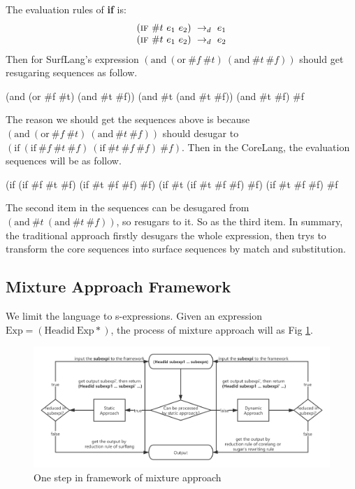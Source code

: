 The evaluation rules of {\bfseries if} is:
\[
\begin{array}{l}
(\mbox{\sc if}~\#t~e_1~e_2) ~\rightarrow_d~ e_1\\
(\mbox{\sc if}~\#t~e_1~e_2) ~\rightarrow_d~ e_2
\end{array}
\]
Then for SurfLang's expression $(\mbox{and}~(\mbox{or}~\#f~\#t)~(\mbox{and}~\#t~\#f))$ should get resugaring sequences as follow.

\begin{Codes}
    (and (or \#f \#t) (and \#t \#f))
\CoreStep (and \#t (and \#t \#f))
\CoreStep (and \#t \#f)
\CoreStep \#f
\end{Codes}

The reason we should get the sequences above is because $(\mbox{and}~(\mbox{or}~\#f~\#t)~(\mbox{and}~\#t~\#f))$ should desugar to $(\mbox{if}~(\mbox{if}~\#f~\#t~\#f)~(\mbox{if}~\#t~\#f~\#f)~\#f)$. Then in the CoreLang, the evaluation sequences will be as follow.
\begin{Codes}
    (if (if \#f \#t \#f) (if \#t \#f \#f) \#f)
\CoreStep (if \#t (if \#t \#f \#f) \#f)
\CoreStep (if \#t \#f \#f)
\CoreStep \#f
\end{Codes}

The second item in the sequences can be desugared from $(\mbox{and}~\#t~(\mbox{and}~\#t~\#f))$, so resugars to it. So as the third item. In summary, the traditional approach firstly desugars the whole expression, then trys to transform the core sequences into surface sequences by match and substitution.

\subsection{Mixture Approach Framework}
We limit the language to s-expressions. Given an expression $\mbox{Exp} = (\mbox{Headid}~\mbox{Exp}*)$, the process of mixture approach will as Fig \ref{fig:mixture}.

\begin{figure}[t]
	\centering
	\includegraphics[width=12cm]{images/mixture.png}
	\caption{One step in framework of mixture approach}
	\label{fig:mixture}
\end{figure}

